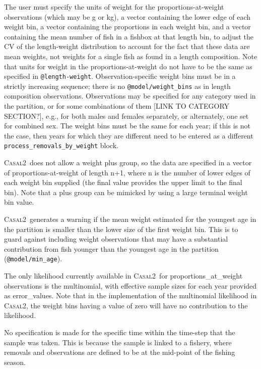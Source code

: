 \documentclass[a4paper,11pt,twoside,pdftex,draft]{article}
\newcommand{\CNAME}{\textsc{Casal2}}
\begin{document}
The user must specify the units of weight for the proportions-at-weight observations (which may be g or kg), a vector containing the lower edge of each weight bin, a vector containing the proportions in each weight bin, and a vector containing the mean number of fish in a fishbox at that length bin, to adjust the CV of the length-weight distribution to account for the fact that these data are mean weights, not weights for a single fish as found in a length composition. Note that units for weight in the proportions-at-weight do not have to be the same as specified in \texttt{@length-weight}. Observation-specific weight bins must be in a strictly increasing sequence; there is no \texttt{@model/weight\_bins} as in length composition observations. Observations may be specified for any category used in the partition, or for some combinations of them [LINK TO CATEGORY SECTION?], e.g., for both males and females separately, or alternately, one set for combined sex. The weight bins must be the same for each year; if this is not the case, then years for which they are different need to be entered as a different \texttt{process\_removals\_by\_weight} block.

\CNAME~does not allow a weight plus group, so the data are specified in a vector of proportions-at-weight of length n+1, where n is the number of lower edges of each weight bin supplied (the final value provides the upper limit to the final bin). Note that a plus group can be mimicked by using a large terminal weight bin value.

\CNAME~generates a warning if the mean weight estimated for the youngest age in the partition is smaller than the lower size of the first weight bin. This is to guard against including weight observations that may have a substantial contribution from fish younger than the youngest age in the partition (\texttt{@model/min\_age}).

The only likelihood currently available in \CNAME~for proportions\_at\_weight observations is the multinomial, with effective sample sizes for each year provided as error\_values. Note that in the implementation of the multinomial likelihood in \CNAME, the weight bins having a value of zero will have no contribution to the likelihood.

No specification is made for the specific time within the time-step that the sample was taken. This is because the sample is linked to a fishery, where removals and observations are defined to be at the mid-point of the fishing season.
\end{document}
